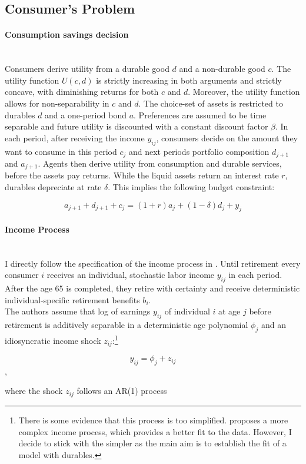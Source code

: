 \documentclass[a4paper,12pt,legno]{article}
\newcommand{\myparagraph}[1]{\paragraph{#1}\mbox{}\\}
\begin{document}
\subsection{Consumer's Problem} 
\myparagraph{Consumption savings decision}
Consumers derive utility from a durable good $d$ and a non-durable good $c$. The utility function $U(c,d)$ is strictly increasing in both arguments and strictly concave, with diminishing returns for both $c$ and $d$. Moreover, the utility function allows for non-separability in $c$ and $d$. The choice-set of assets is restricted to durables $d$ and a one-period bond $a$. Preferences are assumed to be time separable and future utility is discounted with a constant discount factor $\beta$.
In each period, after receiving the income $y_{ij}$, consumers decide on the amount they want to consume in this period $c_{j}$ and next periods portfolio composition $d_{j+1}$ and $a_{j+1}$. Agents then derive utility from consumption and durable services, before the assets pay returns. While the liquid assets return an interest rate $r$, durables depreciate at rate $\delta$. This implies the following budget constraint:  

\begin{equation}
a_{j+1}+d_{j+1}+c_{j}=(1+r)a_{j} + (1-\delta)d_{j}+y_{j}
\end{equation}

\myparagraph{Income Process}
I directly follow the specification of the income process in \cite{hintermaier2011}. Until retirement every consumer $i$ receives an individual, stochastic labor income $y_{ij}$ in each period. After the age 65 is completed, they retire with certainty and receive deterministic individual-specific retirement benefits $b_{i}$. \\
The authors assume that log of earnings $y_{ij}$ of individual $i$ at age $j$ before retirement is additively separable in a deterministic age polynomial $\phi_{j}$ and an idiosyncratic income shock $z_{ij}$:\footnote{There is some evidence that this process is too simplified. \cite{guvenen2015data} proposes a more complex income process, which provides a better fit to the data. However, I decide to stick with the simpler as the main aim is to establish the fit of a model with durables.} 

\begin{equation}\label{eq:income_process}
y_{ij}=\phi_{j}+z_{ij}
\end{equation},


where the shock $z_{ij}$ follows an AR(1) process
\end{document}

